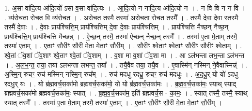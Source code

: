 \documentclass[17pt]{extarticle}
\begin{document}
1. अ॒सा वा॑दि॒त्य आ॑दि॒त्यो॑ ऽसा व॒सा वा॑दि॒त्यः । . आ॒दि॒त्यो न नादि॒त्य आ॑दि॒त्यो न । . न वि वि न न वि । . व्य॑रोचता रोचत॒ वि व्य॑रोचत । . अ॒रो॒च॒त॒ तस्मै॒ तस्मा॑ अरोचता रोचत॒ तस्मै᳚ । . तस्मै॑ दे॒वा दे॒वा स्तस्मै॒ तस्मै॑ दे॒वाः । . दे॒वाः प्राय॑श्चित्ति॒म् प्राय॑श्चित्तिम् दे॒वा दे॒वाः प्राय॑श्चित्तिम् । . प्राय॑श्चित्ति मैच्छन् नैच्छ॒न् प्राय॑श्चित्ति॒म् प्राय॑श्चित्ति मैच्छन्न् । . ऐ॒च्छ॒न् तस्मै॒ तस्मा॑ ऐच्छन् नैच्छ॒न् तस्मै᳚ । . तस्मा॑ ए॒ता मे॒ताम् तस्मै॒ तस्मा॑ ए॒ताम् । . ए॒ताꣳ सौ॒रीꣳ सौ॒री मे॒ता मे॒ताꣳ सौ॒रीम् । . सौ॒रीꣳ श्वे॒ताꣳ श्वे॒ताꣳ सौ॒रीꣳ सौ॒रीꣳ श्वे॒ताम् । . श्वे॒तां ॅव॒शां ॅव॒शाꣳ श्वे॒ताꣳ श्वे॒तां ॅव॒शाम् । . व॒शा मा व॒शां ॅव॒शा मा । . आ ऽल॑भन्ता लभ॒न्ता ऽल॑भन्त । . अ॒ल॒भ॒न्त॒ तया॒ तया॑ ऽलभन्ता लभन्त॒ तया᳚ । . तयै॒वैव तया॒ तयै॒व । . ए॒वास्मि॑न् नस्मिन् ने॒वैवास्मिन्न्॑ । . अ॒स्मि॒न् रुचꣳ॒॒ रुच॑ मस्मिन् नस्मि॒न् रुच᳚म् । . रुच॑ मदधु रदधू॒ रुचꣳ॒॒ रुच॑ मदधुः । . अ॒द॒धु॒र् यो यो॑ ऽदधु रदधु॒र् यः । . यो ब्र॑ह्मवर्च॒सका॑मो ब्रह्मवर्च॒सका॑मो॒ यो यो ब्र॑ह्मवर्च॒सका॑मः । . ब्र॒ह्म॒व॒र्च॒सका॑मः॒ स्याथ् स्याद् ब्र॑ह्मवर्च॒सका॑मो ब्रह्मवर्च॒सका॑मः॒ स्यात् । . ब्र॒ह्म॒व॒र्च॒सका॑म॒ इति॑ ब्रह्मवर्च॒स - का॒मः॒ । . स्यात् तस्मै॒ तस्मै॒ स्याथ् स्यात् तस्मै᳚ । . तस्मा॑ ए॒ता मे॒ताम् तस्मै॒ तस्मा॑ ए॒ताम् । . ए॒ताꣳ सौ॒रीꣳ सौ॒री मे॒ता मे॒ताꣳ सौ॒रीम् । \newline
\end{document}
